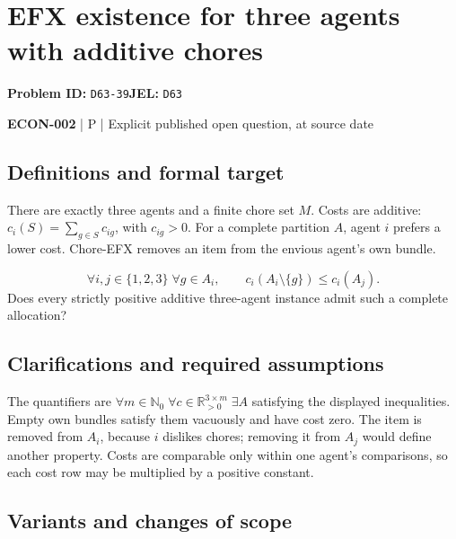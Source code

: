 \documentclass[11pt,a4paper]{article}
\begin{document}
\section*{EFX existence for three agents with additive chores}
\textbf{Problem ID:} \texttt{D63-39}\quad \textbf{JEL:} \texttt{D63}\par
\label{problem:OP-0589}


\label{audited:ECON-002}

{\sffamily\small\color{muted}\textbf{ECON-002} | P | Explicit published open question, at source date\par}

\subsection*{Definitions and formal target}

There are exactly three agents and a finite chore set $M$. Costs are additive: $c_i(S)=\sum_{g\in S}c_{ig}$, with $c_{ig}>0$. For a complete partition $A$, agent $i$ prefers a lower cost. Chore-EFX removes an item from the envious agent's own bundle.

\[
 \forall i,j\in\{1,2,3\}\;\forall g\in A_i,
 \qquad c_i(A_i\setminus\{g\})\leq c_i(A_j).
\]
Does every strictly positive additive three-agent instance admit such a complete allocation?

\subsection*{Clarifications and required assumptions}

The quantifiers are $\forall m\in\mathbb N_0\;\forall c\in\mathbb R_{>0}^{3\times m}\;\exists A$ satisfying the displayed inequalities. Empty own bundles satisfy them vacuously and have cost zero. The item is removed from $A_i$, because $i$ dislikes chores; removing it from $A_j$ would define another property. Costs are comparable only within one agent's comparisons, so each cost row may be multiplied by a positive constant.

\subsection*{Variants and changes of scope}
\end{document}
